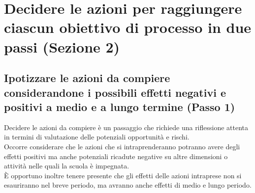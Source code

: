 \documentclass[12pt,a4paper,oneside]{memoir}
\begin{document}
\section[Sezione 2. Azioni per raggiungere ciascun obiettivo]{Decidere le azioni per raggiungere ciascun obiettivo di processo in due passi (Sezione 2)}

\subsection[Passo 1. Ipotizzare le azioni da compiere]{Ipotizzare le azioni da compiere considerandone i possibili effetti negativi e positivi a medio e a lungo termine (Passo 1)}

Decidere le azioni da compiere è un passaggio che richiede una riflessione attenta in termini di valutazione delle potenziali opportunità e rischi.\\
Occorre considerare che le azioni che si intraprenderanno potranno avere degli effetti positivi ma anche potenziali ricadute negative su altre dimensioni o attività nelle quali la scuola è impegnata.\\
È opportuno inoltre tenere presente che gli effetti delle azioni intraprese non si esauriranno nel breve periodo, ma avranno anche effetti di medio e lungo periodo.\\


\begin{center}
\end{center}
\end{document}
